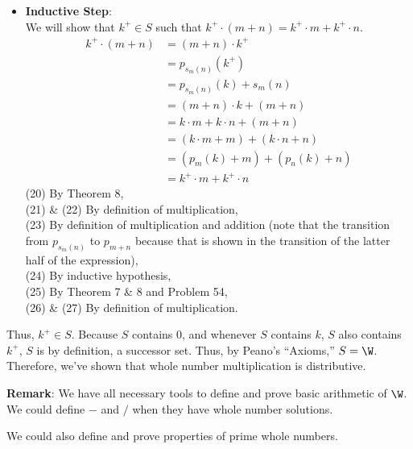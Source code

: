 {\begin{itemize}
                    \item \textbf{Inductive Step}: \\
                    We will show that $k^+\in S$ such that $k^+ \cdot (m + n) = k^+ \cdot m + k^+ \cdot n$. 
                    \begin{align}
                        k^+ \cdot (m + n) &= (m + n) \cdot k^+ \\ 
                        &= p_{s_m(n)}(k^+) \\
                        &= p_{s_m(n)}(k) + s_m(n) \\
                        &= (m + n) \cdot k + (m + n) \\
                        &= k \cdot m + k \cdot n + (m + n) \\ 
                        &= (k \cdot m + m) + (k \cdot n + n) \\
                        &= (p_m(k) + m) + (p_n(k) + n) \\
                        &= k^+\cdot m + k^+\cdot n 
                    \end{align}
                    (20) By Theorem 8, \\
                    (21) \& (22) By definition of multiplication, \\
                    (23) By definition of multiplication and addition (note that the transition from $p_{s_m(n)}$ to $p_{m + n}$ because that is shown in the transition of the latter half of the expression), \\
                    (24) By inductive hypothesis, \\
                    (25) By Theorem 7 \& 8 and Problem 54, \\
                    (26) \& (27) By definition of multiplication.
                    
                \end{itemize}
                 Thus, $k^+ \in S$. Because $S$ contains 0, and whenever $S$ contains $k$, $S$ also contains $k^+$, $S$ is by definition, a successor set. Thus, by Peano's ``Axioms,'' $S = \W$. Therefore, we've shown that whole number multiplication is distributive.
            }

            \noindent\textbf{Remark}: We have all necessary tools to define and prove basic arithmetic of $\W$. We could define $-$ and $/$ when they have whole number solutions.
            
            We could also define and prove properties of prime whole numbers. \\

